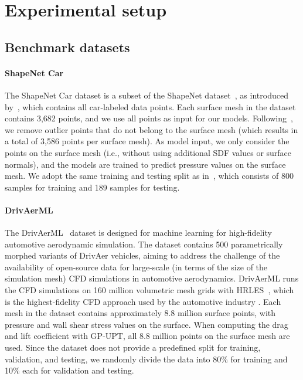 \section{Experimental setup}
\label{appendix:experimental}
\subsection{Benchmark datasets}
\paragraph{ShapeNet Car} The ShapeNet Car dataset is a subset of the ShapeNet dataset~\cite{chang2015shapenet}, as introduced by~\citet{umetani2018learning}, which contains all car-labeled data points. 
Each surface mesh in the dataset contains 3,682 points, and we use all points as input for our models.
Following~\cite{alkin2024universal}, we remove outlier points that do not belong to the surface mesh (which results in a total of 3,586 points per surface mesh).
As model input, we only consider the points on the surface mesh (i.e., without using additional \acl{SDF} values or surface normals), and the models are trained to predict pressure values on the surface mesh.
We adopt the same training and testing split as in~\citet{alkin2024universal}, which consists of 800 samples for training and 189 samples for testing. 

\paragraph{DrivAerML} The DrivAerML~\cite{ashton2024drivaerml} dataset is designed for machine learning for high-fidelity automotive aerodynamic simulation.
The dataset contains 500 parametrically morphed variants of DrivAer vehicles, aiming to address the challenge of the availability of open-source data for large-scale (in terms of the size of the simulation mesh) \acf{CFD} simulations in automotive aerodynamics.
DrivAerML runs the \ac{CFD} simulations on 160 million volumetric mesh grids with \acl{HRLES}~\cite{spalart2006new, chaouat2017state, heinz2020review, ashton2022hlpw}, which is the highest-fidelity \ac{CFD} approach used by the automotive industry \cite{hupertz2022towards,ashton2024drivaerml}.
Each mesh in the dataset contains approximately 8.8 million surface points, with pressure and wall shear stress values on the surface.
When computing the drag and lift coefficient with \ac{GP-UPT}, all 8.8 million points on the surface mesh are used.
Since the dataset does not provide a predefined split for training, validation, and testing, we randomly divide the data into 80\% for training and 10\% each for validation and testing.

